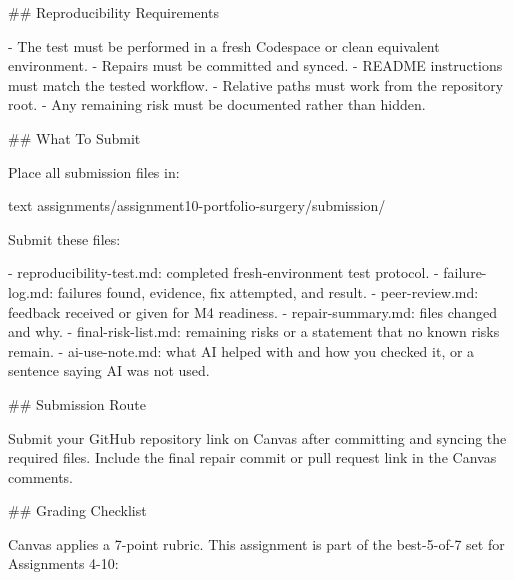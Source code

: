 \documentclass[
  letterpaper,
  DIV=11,
  numbers=noendperiod,
  oneside]{scrreprt}
\newenvironment{Shaded}{\begin{snugshade}}{\end{snugshade}}
\newcommand{\FunctionTok}[1]{\textcolor[rgb]{0.28,0.35,0.67}{#1}}
\newcommand{\InformationTok}[1]{\textcolor[rgb]{0.37,0.37,0.37}{#1}}
\newcommand{\NormalTok}[1]{\textcolor[rgb]{0.00,0.23,0.31}{#1}}
\newcommand{\SpecialStringTok}[1]{\textcolor[rgb]{0.13,0.47,0.30}{#1}}
\begin{document}
\begin{Shaded}
\begin{Highlighting}[numbers=left,,]
\FunctionTok{\#\# Reproducibility Requirements}

\SpecialStringTok{{-} }\NormalTok{The test must be performed in a fresh Codespace or clean equivalent environment.}
\SpecialStringTok{{-} }\NormalTok{Repairs must be committed and synced.}
\SpecialStringTok{{-} }\NormalTok{README instructions must match the tested workflow.}
\SpecialStringTok{{-} }\NormalTok{Relative paths must work from the repository root.}
\SpecialStringTok{{-} }\NormalTok{Any remaining risk must be documented rather than hidden.}

\FunctionTok{\#\# What To Submit}

\NormalTok{Place all submission files in:}

\InformationTok{\textasciigrave{}\textasciigrave{}\textasciigrave{}text}
\InformationTok{assignments/assignment10{-}portfolio{-}surgery/submission/}
\InformationTok{\textasciigrave{}\textasciigrave{}\textasciigrave{}}

\NormalTok{Submit these files:}

\SpecialStringTok{{-} }\InformationTok{\textasciigrave{}reproducibility{-}test.md\textasciigrave{}}\NormalTok{: completed fresh{-}environment test protocol.}
\SpecialStringTok{{-} }\InformationTok{\textasciigrave{}failure{-}log.md\textasciigrave{}}\NormalTok{: failures found, evidence, fix attempted, and result.}
\SpecialStringTok{{-} }\InformationTok{\textasciigrave{}peer{-}review.md\textasciigrave{}}\NormalTok{: feedback received or given for M4 readiness.}
\SpecialStringTok{{-} }\InformationTok{\textasciigrave{}repair{-}summary.md\textasciigrave{}}\NormalTok{: files changed and why.}
\SpecialStringTok{{-} }\InformationTok{\textasciigrave{}final{-}risk{-}list.md\textasciigrave{}}\NormalTok{: remaining risks or a statement that no known risks remain.}
\SpecialStringTok{{-} }\InformationTok{\textasciigrave{}ai{-}use{-}note.md\textasciigrave{}}\NormalTok{: what AI helped with and how you checked it, or a sentence saying AI was not used.}

\FunctionTok{\#\# Submission Route}

\NormalTok{Submit your GitHub repository link on Canvas after committing and syncing the required files. Include the final repair commit or pull request link in the Canvas comments.}

\FunctionTok{\#\# Grading Checklist}

\NormalTok{Canvas applies a 7{-}point rubric. This assignment is part of the best{-}5{-}of{-}7 set for Assignments 4{-}10:}


\end{Highlighting}
\end{Shaded}
\end{document}
